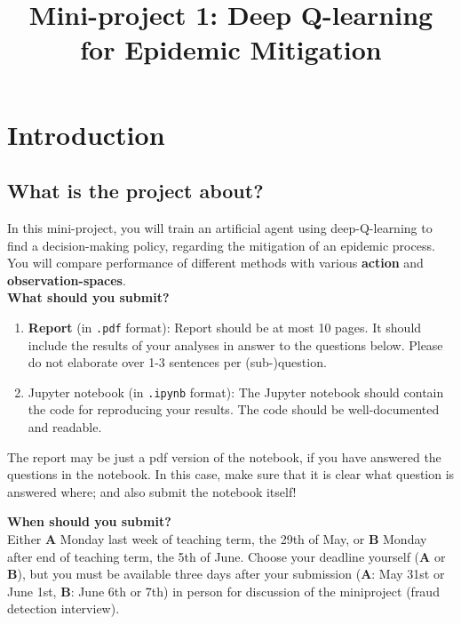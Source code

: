 \documentclass[10pt]{article}
\title{Mini-project 1: Deep Q-learning for Epidemic Mitigation}
\date{}
\begin{document}
\maketitle	
\thispagestyle{fancy}

\section{Introduction}

\subsection*{What is the project about?}

In this mini-project, you will train an artificial agent using deep-Q-learning to find a decision-making policy, regarding the mitigation of an epidemic process. You will compare performance of different methods with various \textbf{action} and \textbf{observation-spaces}.\\


\noindent
\textbf{What should you submit?}
\begin{enumerate}
  \item \textbf{Report} (in \texttt{.pdf} format):
  Report should be at most 10 pages. It should include the results of your analyses in answer to the questions below. Please do not elaborate over 1-3 sentences per (sub-)question. %
  \item Jupyter notebook (in \texttt{.ipynb} format):
  The Jupyter notebook should contain the code for reproducing your results. The code should be well-documented and readable.

\end{enumerate}
\noindent
The report may be just a pdf version of the notebook, if you have answered the questions in the notebook. In this case,
make sure that it is clear what question is answered where; and also submit the notebook itself!

\noindent
\textbf{When should you submit?} \\
Either \textbf{A} Monday last week of teaching term, the 29th of May, or \textbf{B} Monday after end of teaching term, the 5th of June.
Choose your deadline yourself (\textbf{A} or \textbf{B}), but you must be available three days after your submission (\textbf{A}: May 31st or June 1st, \textbf{B}: June 6th or 7th) in
person for discussion of the miniproject (fraud detection interview).
\\
\end{document}
